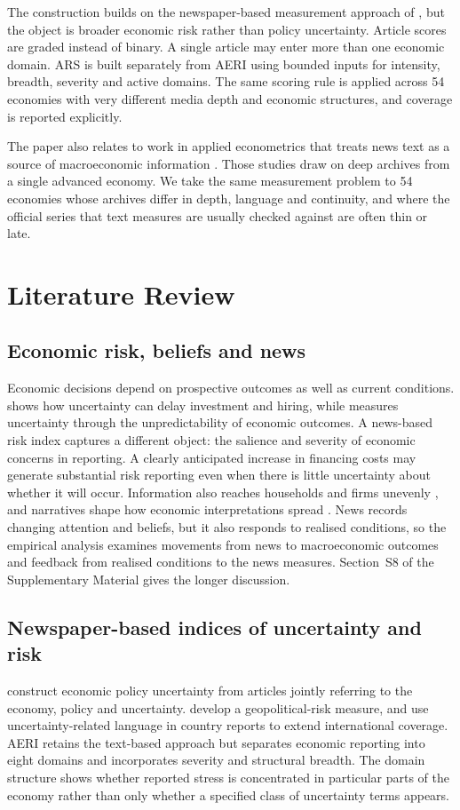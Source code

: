 \documentclass[12pt]{article}
\begin{document}
The construction builds on the newspaper-based measurement approach of \citet{baker2016}, but the object is broader economic risk rather than policy uncertainty. Article scores are graded instead of binary. A single article may enter more than one economic domain. ARS is built separately from AERI using bounded inputs for intensity, breadth, severity and active domains. The same scoring rule is applied across 54 economies with very different media depth and economic structures, and coverage is reported explicitly.

The paper also relates to work in applied econometrics that treats news text as a source of macroeconomic information \citep{thorsrud2020,ellingsen2022,kalamara2022}. Those studies draw on deep archives from a single advanced economy. We take the same measurement problem to 54 economies whose archives differ in depth, language and continuity, and where the official series that text measures are usually checked against are often thin or late.

\section{Literature Review}\label{sec:literature}
\subsection{Economic risk, beliefs and news}
Economic decisions depend on prospective outcomes as well as current conditions. \citet{bloom2009} shows how uncertainty can delay investment and hiring, while \citet{jurado2015} measures uncertainty through the unpredictability of economic outcomes. A news-based risk index captures a different object: the salience and severity of economic concerns in reporting. A clearly anticipated increase in financing costs may generate substantial risk reporting even when there is little uncertainty about whether it will occur. Information also reaches households and firms unevenly \citep{mankiwreis2002}, and narratives shape how economic interpretations spread \citep{shiller2017}. News records changing attention and beliefs, but it also responds to realised conditions, so the empirical analysis examines movements from news to macroeconomic outcomes and feedback from realised conditions to the news measures. Section~S8 of the Supplementary Material gives the longer discussion.
\subsection{Newspaper-based indices of uncertainty and risk}
\citet{baker2016} construct economic policy uncertainty from articles jointly referring to the economy, policy and uncertainty. \citet{caldara2022} develop a geopolitical-risk measure, and \citet{ahir2022} use uncertainty-related language in country reports to extend international coverage. AERI retains the text-based approach but separates economic reporting into eight domains and incorporates severity and structural breadth. The domain structure shows whether reported stress is concentrated in particular parts of the economy rather than only whether a specified class of uncertainty terms appears.
\end{document}
